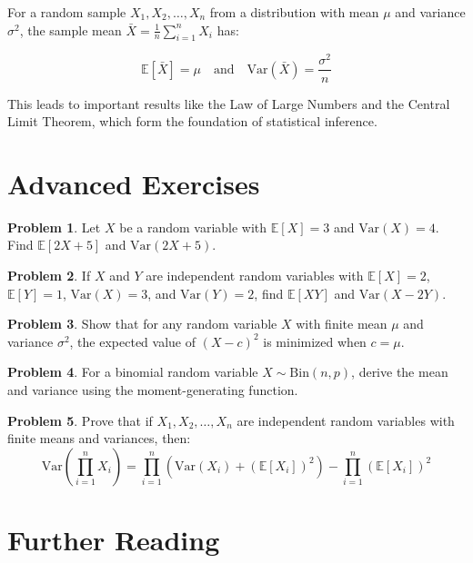 \documentclass[12pt,a4paper]{article}
\theoremstyle{plain}
\theoremstyle{definition}
\newtheorem{problem}{Problem}[section]
\begin{document}
For a random sample $X_1, X_2, \ldots, X_n$ from a distribution with mean $\mu$ and variance $\sigma^2$, the sample mean $\bar{X} = \frac{1}{n}\sum_{i=1}^{n} X_i$ has:

\begin{equation}
\mathbb{E}[\bar{X}] = \mu \quad \text{and} \quad \text{Var}(\bar{X}) = \frac{\sigma^2}{n}
\end{equation}

This leads to important results like the Law of Large Numbers and the Central Limit Theorem, which form the foundation of statistical inference.

\section{Advanced Exercises}

\begin{problem}
Let $X$ be a random variable with $\mathbb{E}[X] = 3$ and $\text{Var}(X) = 4$. Find $\mathbb{E}[2X + 5]$ and $\text{Var}(2X + 5)$.
\end{problem}

\begin{problem}
If $X$ and $Y$ are independent random variables with $\mathbb{E}[X] = 2$, $\mathbb{E}[Y] = 1$, $\text{Var}(X) = 3$, and $\text{Var}(Y) = 2$, find $\mathbb{E}[XY]$ and $\text{Var}(X - 2Y)$.
\end{problem}

\begin{problem}
Show that for any random variable $X$ with finite mean $\mu$ and variance $\sigma^2$, the expected value of $(X - c)^2$ is minimized when $c = \mu$.
\end{problem}

\begin{problem}
For a binomial random variable $X \sim \text{Bin}(n, p)$, derive the mean and variance using the moment-generating function.
\end{problem}

\begin{problem}
Prove that if $X_1, X_2, \ldots, X_n$ are independent random variables with finite means and variances, then:
\begin{equation*}
\text{Var}\left(\prod_{i=1}^{n} X_i\right) = \prod_{i=1}^{n}\left(\text{Var}(X_i) + (\mathbb{E}[X_i])^2\right) - \prod_{i=1}^{n}(\mathbb{E}[X_i])^2
\end{equation*}
\end{problem}

\section{Further Reading}
\end{document}
